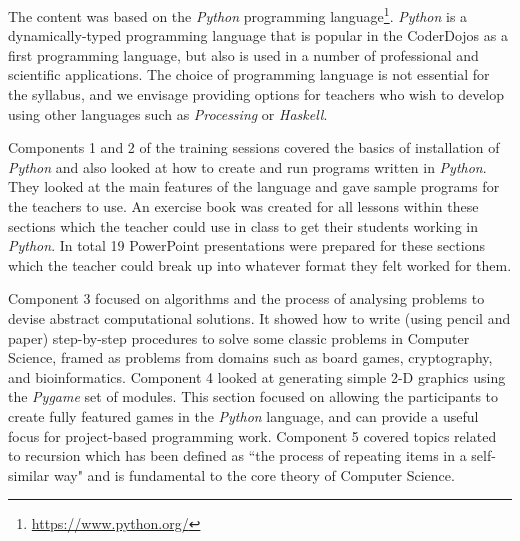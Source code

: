 \documentclass[a4paper]{article}
\begin{document}
The content was based on the \textit{Python} programming language\footnote{\url{https://www.python.org/}}. 
\textit{Python} is a dynamically-typed programming language that is popular in the CoderDojos as a first programming language, but also is used in a number of professional and scientific applications.  The choice of programming language is not essential for the syllabus, and we envisage providing options for teachers who wish to develop using other languages such as \textit{Processing} or \textit{Haskell}.

Components 1 and 2 of the training sessions covered the basics of installation of \textit{Python} and also looked at how to create and run programs written in \textit{Python}. They looked at the main features of the language and gave sample programs for the teachers to use. 
An exercise book was created for all lessons within these sections which the teacher could use in class to get their students working in \textit{Python}. In total 19 PowerPoint presentations were prepared for these sections which the teacher could break up into whatever format they felt worked for them. 

Component 3 focused on algorithms and the process of analysing problems to devise abstract computational solutions.  It showed how to write (using pencil and paper) step-by-step procedures to solve some classic problems in Computer Science, framed as problems from domains such as board games, cryptography, and bioinformatics. Component 4 looked at generating simple 2-D graphics using the \textit{Pygame} set of modules. This section focused on allowing the participants to create fully featured games in the \textit{Python} language, and can provide a useful focus for project-based programming work.  Component 5 covered topics related to recursion which has been defined as ``the process of repeating items in a self-similar way" and is fundamental to the core theory of Computer Science. \\



\end{document}
